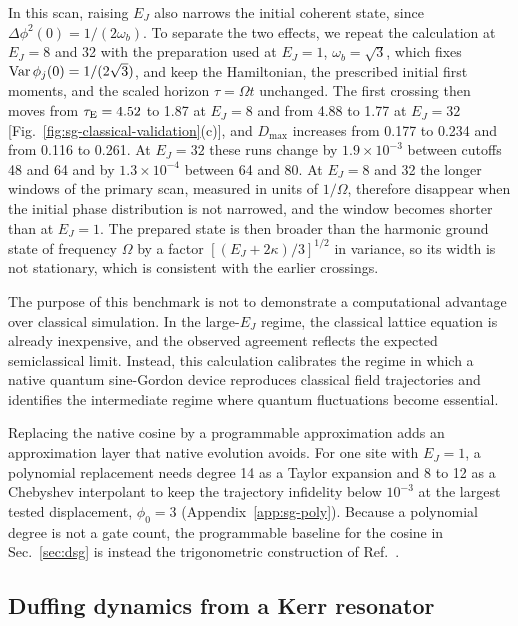 \documentclass[pra,twocolumn,superscriptaddress,nofootinbib,floatfix]{revtex4-2}
\theoremstyle{remark}
\begin{document}
In this scan, raising \(E_J\) also narrows the initial coherent state, since \(\Delta\phi^2(0)=1/(2\omega_b)\). To separate the two effects, we repeat the calculation at \(E_J=8\) and 32 with the preparation used at \(E_J=1\), \(\omega_b=\sqrt3\), which fixes \({\rm Var}\,\phi_j(0)=1/(2\sqrt3)\), and keep the Hamiltonian, the prescribed initial first moments, and the scaled horizon \(\tau=\Omega t\) unchanged. The first crossing then moves from \(\tau_{\rm E}=4.52\) to 1.87 at \(E_J=8\) and from 4.88 to 1.77 at \(E_J=32\) [Fig.~\ref{fig:sg-classical-validation}(c)], and \(D_{\max}\) increases from 0.177 to 0.234 and from 0.116 to 0.261. At \(E_J=32\) these runs change by \(1.9\times10^{-3}\) between cutoffs 48 and 64 and by \(1.3\times10^{-4}\) between 64 and 80. At \(E_J=8\) and 32 the longer windows of the primary scan, measured in units of \(1/\Omega\), therefore disappear when the initial phase distribution is not narrowed, and the window becomes shorter than at \(E_J=1\). The prepared state is then broader than the harmonic ground state of frequency \(\Omega\) by a factor \([(E_J+2\kappa)/3]^{1/2}\) in variance, so its width is not stationary, which is consistent with the earlier crossings.

The purpose of this benchmark is not to demonstrate a computational advantage over classical simulation. In the large-\(E_J\) regime, the classical lattice equation is already inexpensive, and the observed agreement reflects the expected semiclassical limit. Instead, this calculation calibrates the regime in which a native quantum sine-Gordon device reproduces classical field trajectories and identifies the intermediate regime where quantum fluctuations become essential.

Replacing the native cosine by a programmable approximation adds an approximation layer that native evolution avoids. For one site with \(E_J=1\), a polynomial replacement needs degree 14 as a Taylor expansion and 8 to 12 as a Chebyshev interpolant to keep the trajectory infidelity below \(10^{-3}\) at the largest tested displacement, \(\phi_0=3\) (Appendix~\ref{app:sg-poly}). Because a polynomial degree is not a gate count, the programmable baseline for the cosine in Sec.~\ref{sec:dsg} is instead the trigonometric construction of Ref.~\cite{Rainaldi2026TrigonometricCV}.

\subsection{Duffing dynamics from a Kerr resonator}
\label{sec:duffing}
\end{document}
